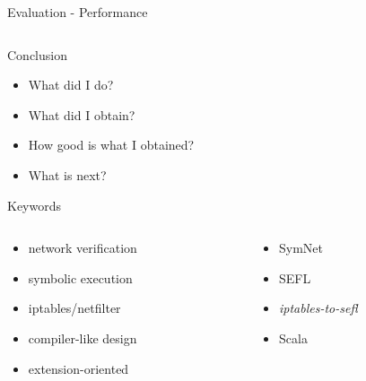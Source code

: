 \documentclass{beamer}
\begin{document}
\begin{frame}{Evaluation - Performance}
\begin{columns}
\begin{column}{.5\textwidth}
    \end{column}
  \end{columns}
\end{frame}

\begin{frame}{Conclusion}
  \begin{itemize}
    \item What did I do?
    \item What did I obtain?
    \item How good is what I obtained?
    \item What is next?
  \end{itemize}
\end{frame}

\begin{frame}{Keywords}
\begin{columns}
  \begin{column}{0.5\textwidth}
    \centering
    \begin{itemize}
      \item network verification
      \item symbolic execution
      \item iptables/netfilter
      \item compiler-like design
      \item extension-oriented
    \end{itemize}
  \end{column}
  \begin{column}{0.5\textwidth}
    \centering
    \begin{itemize}
      \item SymNet
      \item SEFL
      \item \emph{iptables-to-sefl}
      \item Scala
    \end{itemize}
  \end{column}
\end{columns}
\end{frame}
\end{document}
